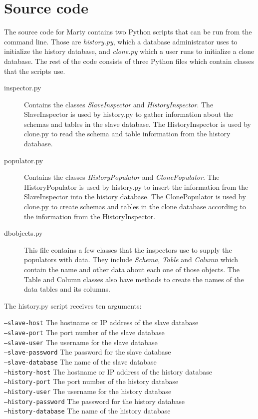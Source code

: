 \section{Source code}
The source code for Marty contains two Python scripts that can be run from the command line.
Those are \textit{history.py}, which a database administrator uses to initialize the history database, and \textit{clone.py} which a user runs to initialize a clone database.
The rest of the code consists of three Python files which contain classes that the scripts use.

\begin{description}
  \item[inspector.py]
    Contains the classes \textit{SlaveInspector} and \textit{HistoryInspector}.
    The SlaveInspector is used by history.py to gather information about the schemas and tables in the slave database.
    The HistoryInspector is used by clone.py to read the schema and table information from the history database.
  \item[populator.py]
    Contains the classes \textit{HistoryPopulator} and \textit{ClonePopulator}.
    The HistoryPopulator is used by history.py to insert the information from the SlaveInspector into the history database.
    The ClonePopulator is used by clone.py to create schemas and tables in the clone database according to the information from the HistoryInspector.
  \item[dbobjects.py]
    This file contains a few classes that the inspectors use to supply the populators with data.
    They include \textit{Schema}, \textit{Table} and \textit{Column} which contain the name and other data about each one of those objects.
    The Table and Column classes also have methods to create the names of the data tables and its columns.
\end{description}

The history.py script receives ten arguments:

\texttt{---slave-host} The hostname or IP address of the slave database \\
\texttt{---slave-port} The port number of the slave database \\
\texttt{---slave-user} The username for the slave database \\
\texttt{---slave-password} The password for the slave database \\
\texttt{---slave-database} The name of the slave database \\
\texttt{---history-host} The hostname or IP address of the history database \\
\texttt{---history-port} The port number of the history database \\
\texttt{---history-user} The username for the history database \\
\texttt{---history-password} The password for the history database \\
\texttt{---history-database} The name of the history database

